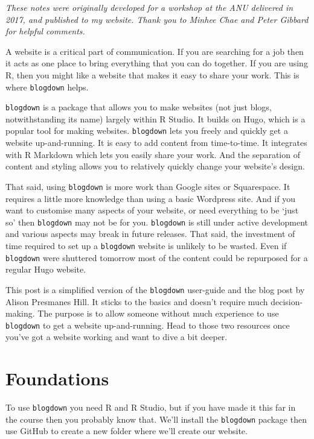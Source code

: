\documentclass[
]{book}
\begin{document}
\emph{These notes were originally developed for a workshop at the ANU delivered in 2017, and published to my website. Thank you to Minhee Chae and Peter Gibbard for helpful comments.}

A website is a critical part of communication. If you are searching for a job then it acts as one place to bring everything that you can do together. If you are using R, then you might like a website that makes it easy to share your work. This is where \texttt{blogdown} helps.

\texttt{blogdown} is a package that allows you to make websites (not just blogs, notwithstanding its name) largely within R Studio. It builds on Hugo, which is a popular tool for making websites. \texttt{blogdown} lets you freely and quickly get a website up-and-running. It is easy to add content from time-to-time. It integrates with R Markdown which lets you easily share your work. And the separation of content and styling allows you to relatively quickly change your website's design.

That said, using \texttt{blogdown} is more work than Google sites or Squarespace. It requires a little more knowledge than using a basic Wordpress site. And if you want to customise many aspects of your website, or need everything to be `just so' then \texttt{blogdown} may not be for you. \texttt{blogdown} is still under active development and various aspects may break in future releases. That said, the investment of time required to set up a \texttt{blogdown} website is unlikely to be wasted. Even if \texttt{blogdown} were shuttered tomorrow most of the content could be repurposed for a regular Hugo website.

This post is a simplified version of the \texttt{blogdown} user-guide and the blog post by Alison Presmanes Hill. It sticks to the basics and doesn't require much decision-making. The purpose is to allow someone without much experience to use \texttt{blogdown} to get a website up-and-running. Head to those two resources once you've got a website working and want to dive a bit deeper.

\hypertarget{foundations}{%
\section{Foundations}\label{foundations}}

To use \texttt{blogdown} you need R and R Studio, but if you have made it this far in the course then you probably know that. We'll install the \texttt{blogdown} package then use GitHub to create a new folder where we'll create our website.
\end{document}
